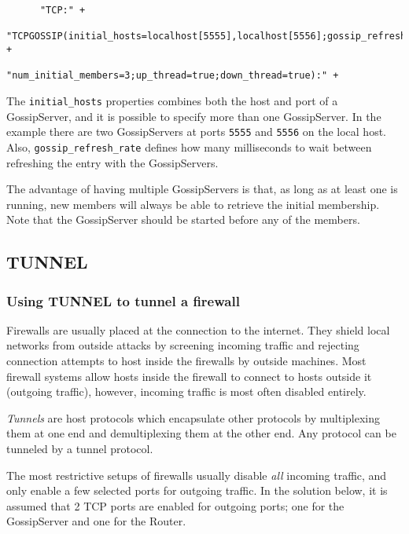       \begin{small}
      \begin{verbatim}
      "TCP:" +
      "TCPGOSSIP(initial_hosts=localhost[5555],localhost[5556];gossip_refresh_rate=10000;" +
                 "num_initial_members=3;up_thread=true;down_thread=true):" +
      \end{verbatim}
      \end{small}
      
      The {\tt initial\_hosts} properties combines both the host and port of a
      GossipServer, and it is possible to specify more than one GossipServer. In the
      example there are two GossipServers at ports {\tt 5555} and {\tt 5556} on the
      local host. Also, {\tt gossip\_refresh\_rate} defines how many milliseconds to
      wait between refreshing the entry with the GossipServers.

      The advantage of having multiple GossipServers is that, as long as at least one
      is running, new members will always be able to retrieve the initial
      membership. Note that the GossipServer should be started before any of the
      members.




    \subsection{TUNNEL}


      \subsubsection{Using TUNNEL to tunnel a firewall}

      Firewalls are usually placed at the connection to the internet. They shield
      local networks from outside attacks by screening incoming traffic and rejecting
      connection attempts to host inside the firewalls by outside machines. Most
      firewall systems allow hosts inside the firewall to connect to hosts outside it
      (outgoing traffic), however, incoming traffic is most often disabled entirely.

      {\em Tunnels} are host protocols which encapsulate other protocols by
      multiplexing them at one end and demultiplexing them at the other end. Any
      protocol can be tunneled by a tunnel protocol.

      The most restrictive setups of firewalls usually disable {\em all} incoming
      traffic, and only enable a few selected ports for outgoing traffic. In the
      solution below, it is assumed that 2 TCP ports are enabled for outgoing ports;
      one for the GossipServer and one for the Router.

